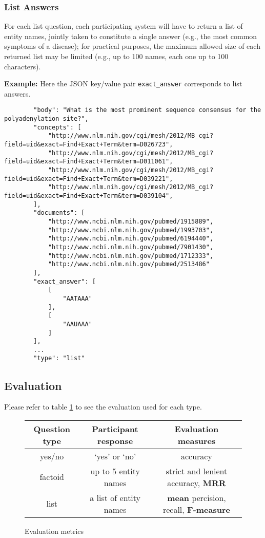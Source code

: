 \subsubsection{List Answers}
\begin{displayquote}
For each list question, each participating system will have to return a list of entity names, jointly taken to constitute a single answer (e.g., the most common symptoms of a disease); for practical purposes,
the maximum allowed size of each returned list may be limited (e.g., up to 100 names, each one up to 100 characters).
\end{displayquote}
\textbf{Example:} Here the JSON key/value pair \verb|exact_answer| corresponds to list answers.  
\small
\begin{verbatim}
        "body": "What is the most prominent sequence consensus for the polyadenylation site?", 
        "concepts": [
            "http://www.nlm.nih.gov/cgi/mesh/2012/MB_cgi?field=uid&exact=Find+Exact+Term&term=D026723", 
            "http://www.nlm.nih.gov/cgi/mesh/2012/MB_cgi?field=uid&exact=Find+Exact+Term&term=D011061", 
            "http://www.nlm.nih.gov/cgi/mesh/2012/MB_cgi?field=uid&exact=Find+Exact+Term&term=D039221", 
            "http://www.nlm.nih.gov/cgi/mesh/2012/MB_cgi?field=uid&exact=Find+Exact+Term&term=D039104", 
        ], 
        "documents": [
            "http://www.ncbi.nlm.nih.gov/pubmed/1915889", 
            "http://www.ncbi.nlm.nih.gov/pubmed/1993703", 
            "http://www.ncbi.nlm.nih.gov/pubmed/6194440", 
            "http://www.ncbi.nlm.nih.gov/pubmed/7901430", 
            "http://www.ncbi.nlm.nih.gov/pubmed/1712333", 
            "http://www.ncbi.nlm.nih.gov/pubmed/2513486"
        ], 
        "exact_answer": [
            [
                "AATAAA"
            ], 
            [
                "AAUAAA"
            ]
        ], 
        ...
        "type": "list"
\end{verbatim}
\normalsize
\subsection{Evaluation}
Please refer to table \ref{fig:eval} to see the evaluation used for each type.
\begin{figure}[h!]
\begin{tabular}{|c|c|c|}
\hline
	\textbf{Question type} & \textbf{Participant response} & \textbf{Evaluation measures}\\ \hline
	yes/no  & `yes' or `no' & accuracy\\ \hline
	factoid & up to 5 entity names & strict and lenient accuracy, \textbf{MRR}\\ \hline
	list & a list of entity names & \textbf{mean} percision, recall, \textbf{F-measure}\\ \hline
\end{tabular}
\label{fig:eval}
\caption{Evaluation metrics}
\end{figure}

